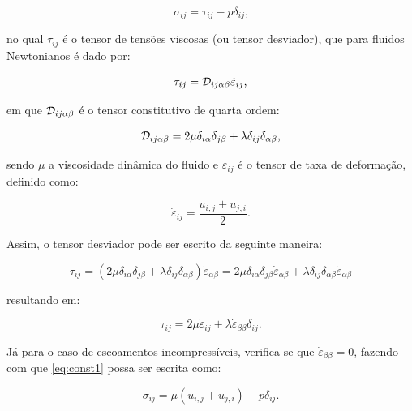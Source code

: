 \begin{equation}
    \sigma_{ij}=\tau_{ij}-p\delta_{ij}\text{,}\label{eq:const1}
\end{equation}

\noindent no qual $\tau_{ij}$ é o tensor de tensões viscosas (ou tensor desviador), que para fluidos Newtonianos é dado por:

\begin{equation}
    \tau_{ij}=\mathcal{D}_{ij\alpha\beta}\dot{\varepsilon}_{ij}\text{,}
\end{equation}

\noindent em que $\mathcal{D}_{ij\alpha\beta}$ é o tensor constitutivo de quarta ordem:

\begin{equation}
    \mathcal{D}_{ij\alpha\beta}=2\mu\delta_{i\alpha}\delta_{j\beta}+\lambda\delta_{ij}\delta_{\alpha\beta}\text{,}
\end{equation}

\noindent sendo $\mu$ a viscosidade dinâmica do fluido e $\dot{\varepsilon}_{ij}$ é o tensor de taxa de deformação, definido como:

\begin{equation}
    \dot{\varepsilon}_{ij}=\frac{u_{i,j}+u_{j,i}}{2}\text{.}\label{eq:deftax1}
\end{equation}

Assim, o tensor desviador pode ser escrito da seguinte maneira:

\[\tau_{ij}=(2\mu\delta_{i\alpha}\delta_{j\beta}+\lambda\delta_{ij}\delta_{\alpha\beta})\dot{\varepsilon}_{\alpha\beta}=2\mu\delta_{i\alpha}\delta_{j\beta}\dot{\varepsilon}_{\alpha\beta}+\lambda\delta_{ij}\delta_{\alpha\beta}\dot{\varepsilon}_{\alpha\beta}\]

\noindent resultando em:

\begin{equation}
    \tau_{ij}=2\mu\dot{\varepsilon}_{ij}+\lambda\dot{\varepsilon}_{\beta\beta}\delta_{ij}\text{.}
\end{equation}

Já para o caso de escoamentos incompressíveis, verifica-se que $\dot{\varepsilon}_{\beta\beta}=0$, fazendo com que \ref{eq:const1} possa ser escrita como:

\begin{equation}
    \sigma_{ij}=\mu(u_{i,j}+u_{j,i})-p\delta_{ij}\text{.}\label{eq:ModConst}
\end{equation}

